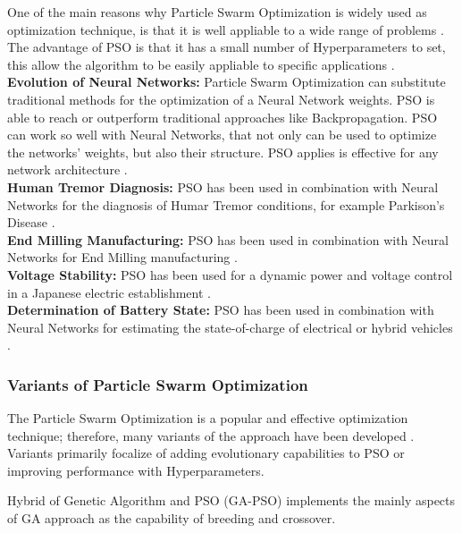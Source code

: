 One of the main reasons why Particle Swarm Optimization is widely used as optimization technique, is that it is well appliable to a wide range of problems \cite{Tesi-3.4}.
The advantage of PSO is that it has a small number of Hyperparameters to set, this allow the algorithm to be easily appliable to specific applications \cite{Tesi-3.4} \cite{Tesi-3.1} \cite{Tesi-3.3} \cite{Tesi-3.5}.
\\[0.3cm]\textbf{Evolution of Neural Networks:} Particle Swarm Optimization can substitute traditional methods for the optimization of a Neural Network weights.
PSO is able to reach or outperform traditional approaches like Backpropagation.
PSO can work so well with Neural Networks, that not only can be used to optimize the networks' weights, but also their structure. PSO applies is effective for any network architecture \cite{Tesi-3.4}.
\\[0.3cm]\textbf{Human Tremor Diagnosis:} PSO has been used in combination with Neural Networks for the diagnosis of Humar Tremor conditions, for example Parkison's Disease \cite{Tesi-3.4}.
\\[0.3cm]\textbf{End Milling Manufacturing:} PSO has been used in combination with Neural Networks for End Milling manufacturing \cite{Tesi-3.4}.
\\[0.3cm]\textbf{Voltage Stability:} PSO has been used for a dynamic power and voltage control in a Japanese electric establishment \cite{Tesi-3.4}.
\\[0.3cm]\textbf{Determination of Battery State:} PSO has been used in combination with Neural Networks for estimating the state-of-charge of electrical or hybrid vehicles \cite{Tesi-3.4}.

\subsubsection{Variants of Particle Swarm Optimization}

The Particle Swarm Optimization is a popular and effective optimization technique; therefore, many variants of the approach have been developed \cite{Tesi-3.2}.
\\[0.3cm]Variants primarily focalize of adding evolutionary capabilities to PSO or improving performance with Hyperparameters.

Hybrid of Genetic Algorithm and PSO (GA-PSO) implements the mainly aspects of GA approach as the capability of breeding and crossover.

